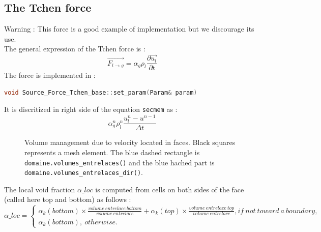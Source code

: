 \subsection{The Tchen force}
{\color{red} Warning} : This force is a good example of implementation but we discourage its use.\\
The general expression of the Tchen force \cite{Tchen1947} is :
\begin{equation}
\overrightarrow{F_{l\rightarrow g}}= \alpha_g\rho_l \frac{\partial \overrightarrow{u_l}}{\partial t}
\end{equation}
The force is implemented in :
\begin{lstlisting}[language=c++]
void Source_Force_Tchen_base::set_param(Param& param)
\end{lstlisting}
It is discritized in right side of the equation \texttt{secmem} as :
\begin{equation}
 \alpha_g^n\rho_l^n \frac{u_l^n-u^{n-1}}{\Delta t}
\end{equation}
\begin{figure}[!ht]
    \centering
{}
    \caption{Volume management due to velocity located in faces. Black squares represents a mesh element. The  blue dashed rectangle is \texttt{domaine.volumes_entrelaces()} and the blue hached part is \texttt{domaine.volumes_entrelaces_dir()}.
}
    \label{entrelace}
\end{figure}
The local void fraction $\alpha\_loc$ is computed from cells on both sides of the face (called here top and bottom) as follows :
\begin{equation}
    \alpha\_loc=\begin{cases} \alpha_k(bottom) \times \frac{volume\ entrelace\ bottom}{volume\ entrelace} +  \alpha_k(top) \times \frac{volume\ entrelace\ top}{volume\ entrelace}, if\ not\ toward\ a\ boundary,\\
        \alpha_k(bottom),\ otherwise.
    \end{cases}
\end{equation}
